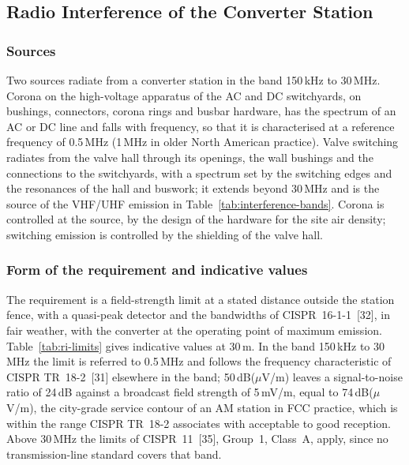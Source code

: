 \subsection{Radio Interference of the Converter Station}
\label{sec:ri}

\subsubsection{Sources}
Two sources radiate from a converter station in the band 150\,kHz to 30\,MHz.
Corona on the high-voltage apparatus of the AC and DC switchyards, on
bushings, connectors, corona rings and busbar hardware, has the spectrum of
an AC or DC line and falls with frequency, so that it is characterised at a
reference frequency of 0.5\,MHz (1\,MHz in older North American practice).
Valve switching radiates from the valve hall through its openings, the
wall bushings and the connections to the switchyards, with a spectrum set by
the switching edges and the resonances of the hall and buswork; it extends
beyond 30\,MHz and is the source of the VHF/UHF emission in
Table~\ref{tab:interference-bands}. Corona is controlled at the source, by
the design of the hardware for the site air density; switching emission is
controlled by the shielding of the valve hall.

\subsubsection{Form of the requirement and indicative values}
The requirement is a field-strength limit at a stated distance outside the
station fence, with a quasi-peak detector and the bandwidths of
CISPR~16-1-1~[32], in fair weather, with the converter at the operating point
of maximum emission. Table~\ref{tab:ri-limits} gives indicative values at
30\,m. In the band 150\,kHz to 30\,MHz the limit is referred to 0.5\,MHz and
follows the frequency characteristic of CISPR TR~18-2~[31] elsewhere in the
band; 50\,dB($\mu$V/m) leaves a signal-to-noise ratio
of 24\,dB against a broadcast field strength of 5\,mV/m, equal to
74\,dB($\mu$V/m), the city-grade service contour of an AM station in FCC
practice, which is within the range CISPR TR~18-2 associates with acceptable
to good reception. Above 30\,MHz the limits of
CISPR~11~[35], Group~1, Class~A, apply, since no transmission-line standard
covers that band.

